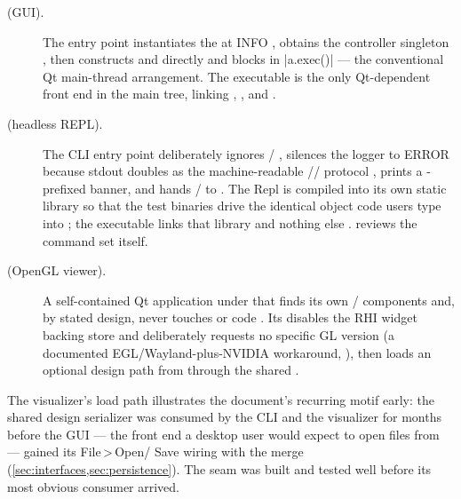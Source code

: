 \begin{description}
\item[ (GUI).] The entry point instantiates the  at INFO
  , obtains the controller singleton , then
  constructs  and  directly and blocks in
  \cppinline|a.exec()|  --- the conventional Qt main-thread
  arrangement. The executable is the only Qt-dependent front end in the main tree, linking
  , , and 
  .
\item[ (headless REPL).] The CLI entry point deliberately ignores
  / , silences the logger to ERROR because
  stdout doubles as the machine-readable // protocol
  , prints a \code{\#}-prefixed banner, and hands
  / to  . The Repl
  is compiled into its own  static library so that the test binaries drive the
  identical object code users type into ; the executable links that
  library and nothing else .  reviews the
  command set itself.
\item[ (OpenGL viewer).] A self-contained Qt application under
   that finds its own / components
   and, by stated design, never touches  or
   code . Its  disables the RHI
  widget backing store  and deliberately requests no specific
  GL version (a documented EGL/Wayland-plus-NVIDIA workaround,
  ), then loads an optional  design path from
    through the shared
   .
\end{description}

The visualizer's load path illustrates the document's recurring motif early: the shared
design serializer was consumed by the CLI and the visualizer for months before the GUI ---
the front end a desktop user would expect to open files from --- gained its File\,>\,Open/%
Save wiring with the  merge
(\cref{sec:interfaces,sec:persistence}). The seam was built and tested well before its most
obvious consumer arrived.

